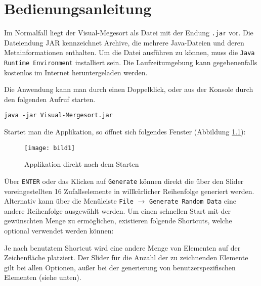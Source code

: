 \chapter{Bedienungsanleitung}\label{chap:bedienungsanleitung}

Im Normalfall liegt der Visual-Megesort als Datei mit der Endung \texttt{.jar} vor. Die Dateiendung JAR kennzeichnet Archive, die mehrere Java-Dateien und deren Metainformationen enthalten. Um die Datei ausführen zu können, muss die \texttt{Java Runtime Environment} installiert sein. Die Laufzeitumgebung kann gegebenenfalls kostenlos im Internet heruntergeladen werden.

Die Anwendung kann man durch einen Doppelklick, oder aus der Konsole durch den folgenden Aufruf starten.

\begin{verbatim}
java -jar Visual-Mergesort.jar
\end{verbatim}

Startet man die Applikation, so öffnet sich folgendes Fenster (Abbildung \ref{figure:start-app}):

\begin{figure}[!htb]
    \centering
      \texttt{[image: bild1]}
    \caption{Applikation direkt nach dem Starten}
    \label{figure:start-app}
\end{figure}

Über \texttt{ENTER} oder das Klicken auf \texttt{Generate} können direkt die über den Slider voreingestellten 16 Zufallselemente in willkürlicher Reihenfolge generiert werden. Alternativ kann über die Menüleiste \texttt{File} $\rightarrow$ \texttt{Generate Random Data} eine andere Reihenfolge ausgewählt werden. Um einen schnellen Start mit der gewünschten Menge zu ermöglichen, existieren folgende Shortcuts, welche optional verwendet werden können:

Je nach benutztem Shortcut wird eine andere Menge von Elementen auf der Zeichenfläche platziert. Der Slider für die Anzahl der zu zeichnenden Elemente gilt bei allen Optionen, außer bei der generierung von benutzerspezifischen Elementen (siehe unten).

